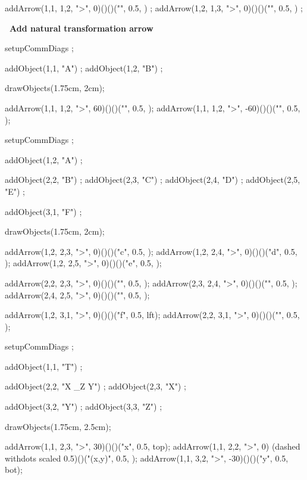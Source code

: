   addArrow(1,1, 1,2, ">", 0)()()("", 0.5, ) ;
  addArrow(1,2, 1,3, ">", 0)()()("", 0.5, ) ;
\stopMPcode\stopformula
\stopbuffer

\processTEXbuffer

\typebuffer

{\bf \color[red]\ Add natural transformation arrow}

\startbuffer
\startformula{}
  setupCommDiags ;
  
  addObject(1,1, "A") ;
  addObject(1,2, "B") ;
  
  drawObjects(1.75cm, 2cm);
  
  addArrow(1,1, 1,2, ">",  60)()()("", 0.5, );
  addArrow(1,1, 1,2, ">", -60)()()("", 0.5, );
\stopMPcode\stopformula
\stopbuffer

\processTEXbuffer

\typebuffer

\startbuffer
\startformula{}
  setupCommDiags ;
  
  addObject(1,2, "A") ;
  
  addObject(2,2, "B") ;
  addObject(2,3, "C") ;
  addObject(2,4, "D") ;
  addObject(2,5, "E") ;
  
  addObject(3,1, "F") ;
  
  drawObjects(1.75cm, 2cm);
  
  addArrow(1,2, 2,3, ">", 0)()()("c", 0.5, );
  addArrow(1,2, 2,4, ">", 0)()()("d", 0.5, );
  addArrow(1,2, 2,5, ">", 0)()()("e", 0.5, );

  addArrow(2,2, 2,3, ">", 0)()()("", 0.5, );
  addArrow(2,3, 2,4, ">", 0)()()("", 0.5, );
  addArrow(2,4, 2,5, ">", 0)()()("", 0.5, );
  
  addArrow(1,2, 3,1, ">", 0)()()("f", 0.5, lft);
  addArrow(2,2, 3,1, ">", 0)()()("",  0.5, );
\stopMPcode\stopformula
\stopbuffer

\processTEXbuffer

\typebuffer

\startbuffer
\startformula{}
  setupCommDiags ;
  
  addObject(1,1, "T") ;
  
  addObject(2,2, "X \times_Z Y") ;
  addObject(2,3, "X") ;
  
  addObject(3,2, "Y") ;
  addObject(3,3, "Z") ;
    
  drawObjects(1.75cm, 2.5cm);
  
  addArrow(1,1, 2,3, ">", 30)()()("x", 0.5, top);
  addArrow(1,1, 2,2, ">", 0)
    (dashed withdots scaled 0.5)()("(x,y)", 0.5, );
  addArrow(1,1, 3,2, ">", -30)()()("y", 0.5, bot);

